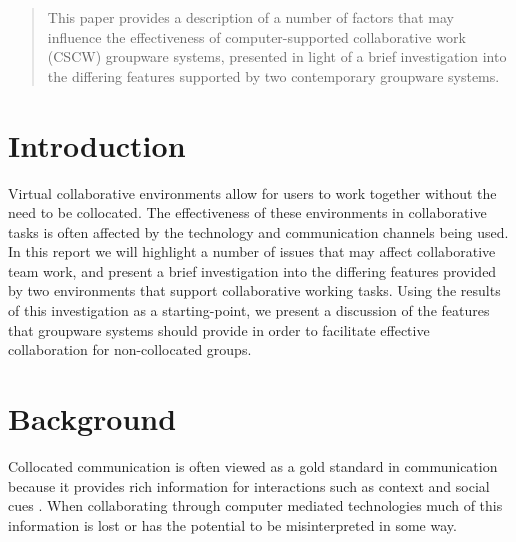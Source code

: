 \documentclass{acm_proc_article-sp}
\begin{document}
\maketitle
\begin{abstract}
This paper provides a description of a number of factors that may influence the effectiveness of computer-supported collaborative work (CSCW) groupware systems, presented in light of a brief investigation into the differing features supported by two contemporary groupware systems.
\end{abstract}



\section{Introduction}
Virtual collaborative environments allow for users to work together without the need to be collocated. The effectiveness of these environments in collaborative tasks is often affected by the technology and communication channels being used. In this report we will highlight a number of issues that may affect collaborative team work, and present a brief investigation into the differing features provided by two environments that support collaborative working tasks. Using the results of this investigation as a starting-point, we present a discussion of the features that groupware systems should provide in order to facilitate effective collaboration for non-collocated groups.

\section{Background}

Collocated communication is often viewed as a gold standard in communication because it provides rich information for interactions such as context and social cues \cite{olsondistance2000}. When collaborating through computer mediated technologies much of this information is lost or has the potential to be misinterpreted in some way.
\end{document}
